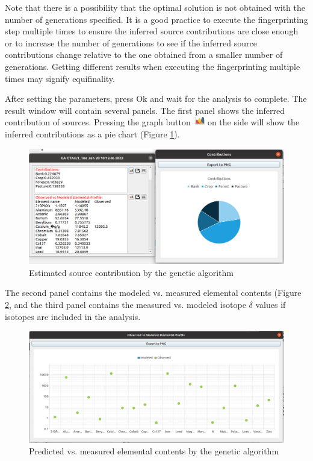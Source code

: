 \documentclass[12pt]{report}
\begin{document}
Note that there is a possibility that the optimal solution is not obtained with the number of generations specified. It is a good practice to execute the fingerprinting step multiple times to ensure the inferred source contributions are close enough or to increase the number of generations to see if the inferred source contributions change relative to the one obtained from a smaller number of generations. Getting different results when executing the fingerprinting multiple times may signify equifinality. 

After setting the parameters, press Ok and wait for the analysis to complete. The result window will contain several panels. The first panel shows the inferred contribution of sources. Pressing the graph button \includegraphics[width=0.5cm]{Figures/Graph.png} on the side will show the inferred contributions as a pie chart (Figure \ref{fig:GA-contribution}).   

\begin{figure}[ht]
    \centering
    \includegraphics[width=14cm]{Figures/GA_Contributions.png}
    \caption{Estimated source contribution by the genetic algorithm }
    \label{fig:GA-contribution}
\end{figure}
\FloatBarrier

The second panel contains the modeled vs. measured elemental contents (Figure \ref{fig:GA-modeledvsobserved}, and the third panel contains the measured vs. modeled isotope $\delta$ values if isotopes are included in the analysis. 

\begin{figure}[ht]
    \centering
    \includegraphics[width=14cm]{Figures/GA-Modeled_vs_measured_graph.png}
    \caption{Predicted vs. measured elemental contents by the genetic algorithm}
    \label{fig:GA-modeledvsobserved}
\end{figure}
\FloatBarrier
\end{document}

